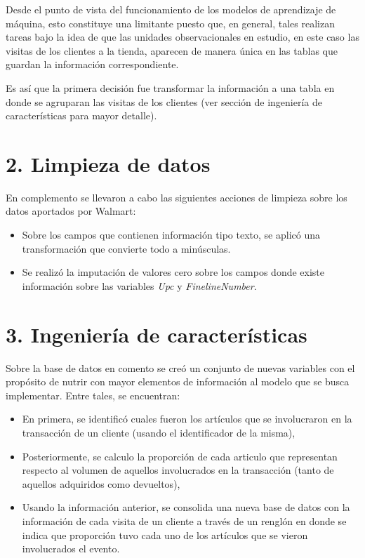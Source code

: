 \documentclass[]{book}
\providecommand{\tightlist}{%
  \setlength{\itemsep}{0pt}\setlength{\parskip}{0pt}}
\begin{document}
Desde el punto de vista del funcionamiento de los modelos de aprendizaje de máquina, esto constituye una limitante puesto que, en general, tales realizan tareas bajo la idea de que las unidades observacionales en estudio, en este caso las visitas de los clientes a la tienda, aparecen de manera única en las tablas que guardan la información correspondiente.

Es así que la primera decisión fue transformar la información a una tabla en donde se agruparan las visitas de los clientes (ver sección de ingeniería de características para mayor detalle).

\hypertarget{limpieza-de-datos}{%
\section{2. Limpieza de datos}\label{limpieza-de-datos}}

En complemento se llevaron a cabo las siguientes acciones de limpieza sobre los datos aportados por Walmart:

\begin{itemize}
\tightlist
\item
  Sobre los campos que contienen información tipo texto, se aplicó una transformación que convierte todo a minúsculas.
\item
  Se realizó la imputación de valores cero sobre los campos donde existe información sobre las variables \emph{Upc} y \emph{FinelineNumber}.
\end{itemize}

\hypertarget{ingenieruxeda-de-caracteruxedsticas}{%
\section{3. Ingeniería de características}\label{ingenieruxeda-de-caracteruxedsticas}}

Sobre la base de datos en comento se creó un conjunto de nuevas variables con el propósito de nutrir con mayor elementos de información al modelo que se busca implementar. Entre tales, se encuentran:

\begin{itemize}
\tightlist
\item
  En primera, se identificó cuales fueron los artículos que se involucraron en la transacción de un cliente (usando el identificador de la misma),
\item
  Posteriormente, se calculo la proporción de cada articulo que representan respecto al volumen de aquellos involucrados en la transacción (tanto de aquellos adquiridos como devueltos),
\item
  Usando la información anterior, se consolida una nueva base de datos con la información de cada visita de un cliente a través de un renglón en donde se indica que proporción tuvo cada uno de los artículos que se vieron involucrados el evento.
\end{itemize}
\end{document}
